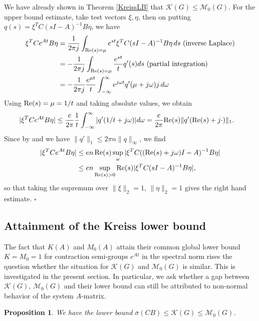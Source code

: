 \documentclass[12pt, a4paper,reqno]{amsart}
\newtheorem{proposition}{\bf Proposition}
\renewenvironment{proof}{\noindent {\bf Proof: }}{\rm\\}
\theoremstyle{definition}
\begin{document}
\begin{proof}
We have already shown in Theorem \ref{KreissLB} that $\mathcal K(G) \leq \mathcal M_0(G)$. For the upper bound estimate, take test vectors $\xi,\eta$, then on putting
$q(s) = \xi^TC(sI-A)^{-1}B\eta$, we have
\begin{align*}
\xi^T C e^{At} B\eta &= \frac{1}{2\pi j} \int_{{\rm Re}(s)=\mu} e^{st} \xi^TC(sI-A)^{-1}B\eta\, ds   \mbox{ (inverse Laplace)}\\
&= - \frac{1}{2\pi j} \int_{{\rm Re}(s)=\mu} \frac{e^{st}}{t} q'(s) ds  \mbox{ (partial integration)}\\ &= -\frac{1}{2\pi j} \frac{e^{\mu t}}{t} \int_{-\infty}^\infty e^{j\omega t} q'(\mu+j\omega) j\, d\omega
\end{align*}
%
Using
 ${\rm Re}(s)=\mu = 1/t$ and taking absolute values, we obtain
 \begin{align*}
 | \xi^TCe^{At}B\eta| 
&\leq \frac{e}{2\pi} \frac{1}{t} \int_{-\infty}^\infty |q'(1/t+j \omega) | d\omega = \frac{e}{2\pi} {\rm Re}(s) \|q'({\rm Re}(s) + j \cdot)\|_1.
  \end{align*}
Since by \cite{spijker} and \cite{leveque} we have
$\|q'\|_1 \leq 2\pi n \|q\|_\infty$, we find
\begin{align*}
|\xi^T Ce^{At}B\eta| &\leq en\, {\rm Re}(s) \sup_\omega | \xi^T C(({\rm Re}(s)+j\omega)I-A)^{-1} B\eta| \\
&\leq en \sup_{{\rm Re}(s) >0} {\rm Re}(s) |\xi^T C(sI-A)^{-1} B\eta|,
\end{align*}
so that taking the supremum over $\|\xi\|_2=1$, $\|\eta\|_2=1$ gives the right hand estimate.
\hfill $\square$
\end{proof}



\subsection{Attainment of the Kreiss lower bound}
\label{new_subs}
The fact that $K(A)$ and $M_0(A)$ attain their common global lower bound $K=M_0=1$
for contraction semi-groups $e^{At}$ in the spectral norm rises the question
whether the situation for $\mathcal K(G)$ and $\mathcal M_0(G)$ is similar. This is investigated in the present
section.  In particular, we ask whether a gap between $\mathcal K(G)$, $\mathcal M_0(G)$  and their 
lower bound can still be attributed to non-normal behavior of the system $A$-matrix.



\begin{proposition}
\label{bound}
We have the 
lower bound $\overline{\sigma}(CB) \leq \mathcal K(G)\leq \mathcal M_0(G)$.
\end{proposition}
\end{document}
